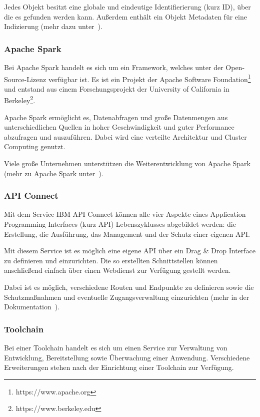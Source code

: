 Jedes Objekt besitzt eine globale und eindeutige Identifierierung (kurz ID), über die es gefunden werden kann. Außerdem
enthält ein Objekt Metadaten für eine Indizierung (mehr dazu unter~\cite{book_grundlagen_objectstorage}).

\subsubsection{Apache Spark}
Bei Apache Spark handelt es sich um ein Framework, welches unter der Open-Source-Lizenz verfügbar ist. Es ist ein
Projekt der Apache Software Foundation\footnote{https://www.apache.org} und entstand aus einem Forschungsprojekt der
University of California in Berkeley\footnote{https://www.berkeley.edu}.

Apache Spark ermöglicht es, Datenabfragen und große Datenmengen aus unterschiedlichen Quellen in hoher Geschwindigkeit
und guter Performance abzufragen und auszuführen. Dabei wird eine verteilte Architektur und Cluster Computing genutzt.

Viele große Unternehmen unterstützen die Weiterentwicklung von Apache Spark (mehr zu Apache Spark
unter~\cite{book_grundlagen_apachespark}).

\subsubsection{API Connect}
Mit dem Service IBM API Connect können alle vier Aspekte eines Application Programming Interfaces (kurz API)
Lebenszyklusses abgebildet werden: die Erstellung, die Ausführung, das Management und der Schutz einer eigenen API.

Mit diesem Service ist es möglich eine eigene API über ein Drag \& Drop Interface zu definieren und einzurichten. Die
so erstellten Schnittstellen können anschließend einfach über einen Webdienst zur Verfügung gestellt werden.

Dabei ist es möglich, verschiedene Routen und Endpunkte zu definieren sowie die Schutzmaßnahmen und eventuelle
Zugangsverwaltung einzurichten (mehr in der Dokumentation~\cite{book_grundlagen_apiconnect}).

\subsubsection{Toolchain}
Bei einer Toolchain handelt es sich um einen Service zur Verwaltung von Entwicklung, Bereitstellung sowie Überwachung
einer Anwendung. Verschiedene Erweiterungen stehen nach der Einrichtung einer Toolchain zur Verfügung.

